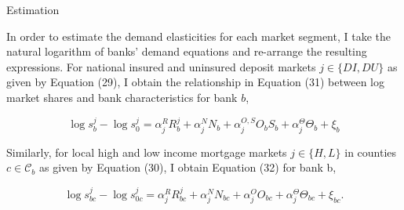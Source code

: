 \documentclass[notes,10pt, aspectratio=169]{beamer}
\newenvironment{wideitemize}{\itemize\addtolength{\itemsep}{10pt}}{\enditemize}
\begin{document}
\begin{frame}{Estimation}

        \vspace{0.3cm}
        \begin{wideitemize}
            \item In order to estimate the demand elasticities for each market segment, I take the natural logarithm of banks' demand equations and re-arrange the resulting expressions. For national insured and uninsured deposit markets $j \in\{D I, D U\}$ as given by Equation (29), I obtain the relationship in Equation (31) between log market shares and bank characteristics for bank $b$,

            $$
            \log s_b^j-\log s_0^j=\alpha_j^R R_b^j+\alpha_j^N N_b+\alpha_j^{O, S} O_b S_b+\alpha_j^{\Theta} \Theta_b+\xi_b
            $$
            
            
            \item Similarly, for local high and low income mortgage markets $j \in\{H, L\}$ in counties $c \in \mathcal{C}_b$ as given by Equation (30), I obtain Equation (32) for bank b,
            
            $$
            \log s_{b c}^j-\log s_{0 c}^j=\alpha_j^R R_{b c}^j+\alpha_j^N N_{b c}+\alpha_j^O O_{b c}+\alpha_j^{\Theta} \Theta_{b c}+\xi_{b c} .
            $$
            
    \end{wideitemize}

\end{frame}
\end{document}

